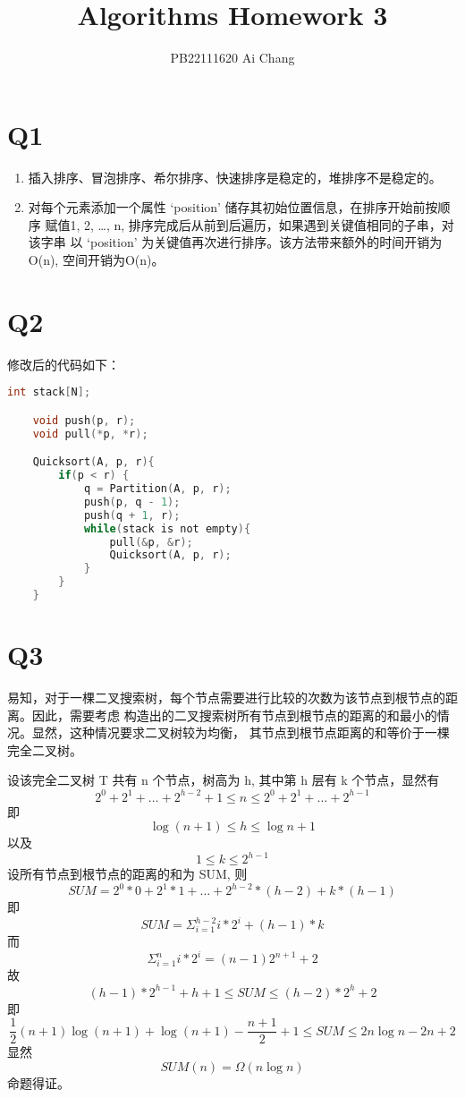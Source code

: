 \documentclass[UTF8]{ctexart} %
\title{Algorithms Homework 3}
\author{PB22111620 Ai Chang}
\begin{document}
\begin{sloppypar}   %

\maketitle

\section*{Q1}
\begin{enumerate}
    \item 插入排序、冒泡排序、希尔排序、快速排序是稳定的，堆排序不是稳定的。
    \item 对每个元素添加一个属性 `position' 储存其初始位置信息，在排序开始前按顺序
    赋值1, 2, \dots, n, 排序完成后从前到后遍历，如果遇到关键值相同的子串，对该字串
    以 `position' 为关键值再次进行排序。该方法带来额外的时间开销为O(n), 空间开销为O(n)。
\end{enumerate}

\section*{Q2}
    修改后的代码如下：
    \begin{lstlisting}[language=C]
    int stack[N];

    void push(p, r);
    void pull(*p, *r);

    Quicksort(A, p, r){
        if(p < r) {
            q = Partition(A, p, r);
            push(p, q - 1);
            push(q + 1, r);
            while(stack is not empty){
                pull(&p, &r);
                Quicksort(A, p, r);
            }
        }
    }
    \end{lstlisting}

\section*{Q3}
易知，对于一棵二叉搜索树，每个节点需要进行比较的次数为该节点到根节点的距离。因此，需要考虑
构造出的二叉搜索树所有节点到根节点的距离的和最小的情况。显然，这种情况要求二叉树较为均衡，
其节点到根节点距离的和等价于一棵完全二叉树。

设该完全二叉树 T 共有 n 个节点，树高为 h, 其中第 h 层有 k 个节点，显然有
$$2^0 + 2^1 + \dots + 2^{h-2} + 1 \leq n \leq 2^0 + 2^1 + \dots + 2^{h-1}$$
即$$\log(n+1) \leq h \leq \log n + 1$$
以及$$1 \leq k \leq 2^{h-1}$$
设所有节点到根节点的距离的和为 SUM, 则$$SUM = 2^0*0 + 2^1*1 + \dots + 2^{h-2}*(h-2) + k*(h-1)$$
即$$SUM = \Sigma_{i=1}^{h-2}i*2^i + (h-1)*k$$
而$$\Sigma_{i=1}^n i*2^i = (n-1)2^{n+1}+2$$
故$$(h-1)*2^{h-1}+h+1 \leq SUM \leq (h-2)*2^h+2$$
即$$\frac{1}{2}(n+1)\log(n+1)+\log(n+1)-\frac{n+1}{2}+1 \leq SUM \leq 2n\log n-2n+2$$
显然$$SUM(n) = \Omega(n\log n)$$命题得证。


\end{sloppypar}
\end{document}
